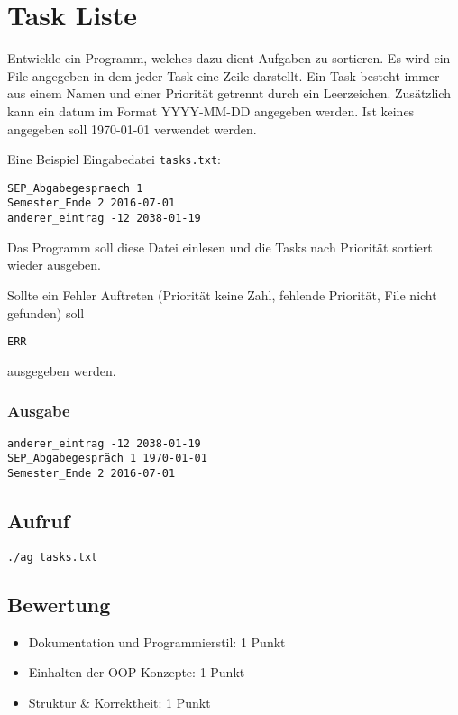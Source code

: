 \documentclass[a4paper,10pt]{article}
\begin{document}
\section*{Task Liste}

Entwickle ein Programm, welches dazu dient Aufgaben zu sortieren. Es wird ein File angegeben in dem jeder Task eine Zeile darstellt. Ein Task besteht immer aus einem Namen und einer Priorität getrennt durch ein Leerzeichen. Zusätzlich kann ein datum im Format YYYY-MM-DD angegeben werden. Ist keines angegeben soll 1970-01-01 verwendet werden.

Eine Beispiel Eingabedatei \texttt{tasks.txt}:
\begin{lstlisting}[frame=single]
SEP_Abgabegespraech 1 
Semester_Ende 2 2016-07-01
anderer_eintrag -12 2038-01-19
\end{lstlisting}

Das Programm soll diese Datei einlesen und die Tasks nach Priorität sortiert wieder ausgeben.

Sollte ein Fehler Auftreten (Priorität keine Zahl, fehlende Priorität, File nicht gefunden) soll
\begin{verbatim}
ERR
\end{verbatim}
ausgegeben werden.

\subsubsection*{Ausgabe}
\begin{verbatim}
anderer_eintrag -12 2038-01-19
SEP_Abgabegespräch 1 1970-01-01
Semester_Ende 2 2016-07-01
\end{verbatim}

\subsection*{Aufruf}
\texttt{./ag tasks.txt}

\subsection*{Bewertung}
\begin{itemize}
 \item Dokumentation und Programmierstil: 1 Punkt
 \item Einhalten der OOP Konzepte: 1 Punkt
 \item Struktur \& Korrektheit: 1 Punkt
\end{itemize}

\newpage
\end{document}
